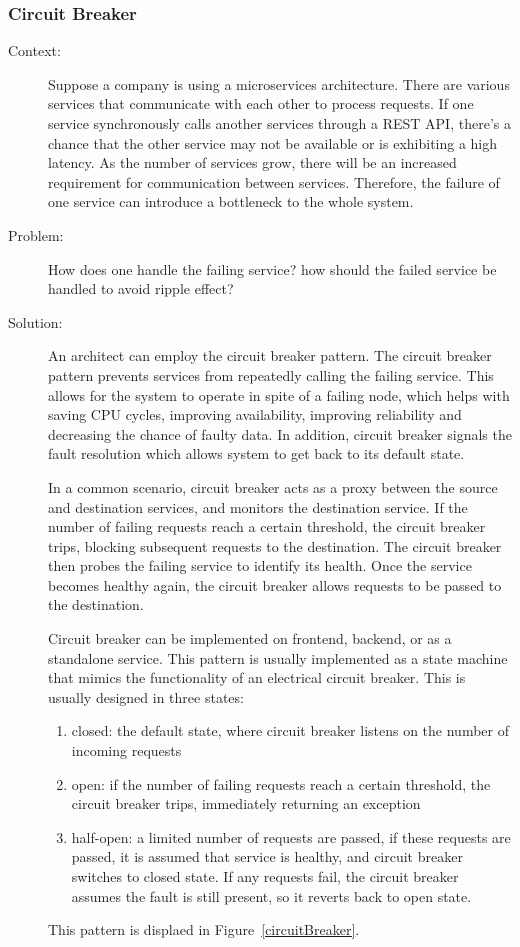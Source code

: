 \documentclass{bmcart}
\begin{document}
\subsubsection{Circuit Breaker}

\begin{description}
  \item[Context:] Suppose a company is using a microservices architecture. There are various services that communicate with each other to process requests. If one service synchronously calls another services through a REST API, there's a chance that the other service may not be available or is exhibiting a high latency. As the number of services grow, there will be an increased requirement for communication between services. Therefore, the failure of one service can introduce a bottleneck to the whole system.
  \item[Problem:] How does one handle the failing service? how should the failed service be handled to avoid ripple effect? 
  \item[Solution:] An architect can employ the circuit breaker pattern. The circuit breaker pattern prevents services from repeatedly calling the failing service. This allows for the system to operate in spite of a failing node, which helps with saving CPU cycles, improving availability, improving reliability and decreasing the chance of faulty data. In addition, circuit breaker signals the fault resolution which allows system to get back to its default state. 

  In a common scenario, circuit breaker acts as a proxy between the source and destination services, and monitors the destination service. If the number of failing requests reach a certain threshold, the circuit breaker trips, blocking subsequent requests to the destination. The circuit breaker then probes the failing service to identify its health. Once the service becomes healthy again, the circuit breaker allows requests to be passed to the destination. 
  
  Circuit breaker can be implemented on frontend, backend, or as a standalone service. This pattern is usually implemented as a state machine that mimics the functionality of an electrical circuit breaker. This is usually designed in three states: 
  \begin{enumerate}
    \item closed: the default state, where circuit breaker listens on the number of incoming requests
    \item open: if the number of failing requests reach a certain threshold, the circuit breaker trips, immediately returning an exception
    \item half-open: a limited number of requests are passed, if these requests are passed, it is assumed that service is healthy, and circuit breaker switches to closed state. If any requests fail, the circuit breaker assumes the fault is still present, so it reverts back to open state.
  \end{enumerate}
  
  This pattern is displaed in Figure~\ref{circuitBreaker}.   
\end{description}
\end{document}
